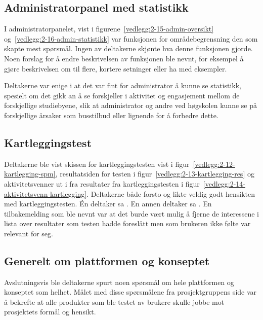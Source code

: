 \subsection{Administratorpanel med statistikk}

I administratorpanelet, vist i figurene~\ref{vedlegg:2-15-admin-oversikt} og~\ref{vedlegg:2-16-admin-statistikk} var funksjonen for områdebegrensning den som skapte mest spørsmål. Ingen av deltakerne skjønte hva denne funksjonen gjorde. Noen forslag for å endre beskrivelsen av funksjonen ble nevnt, for eksempel å gjøre beskrivelsen om til flere, kortere setninger eller ha med eksempler.

Deltakerne var enige i at det var fint for administrator å kunne se statistikk, spesielt om det gikk an å se forskjeller i aktivitet og engasjement mellom de forskjellige studiebyene, slik at administrator og andre ved høgskolen kunne se på forskjellige årsaker som busstilbud eller lignende for å forbedre dette.


\subsection{Kartleggingstest}

Deltakerne ble vist skissen for kartleggingstesten vist i figur~\ref{vedlegg:2-12-kartlegging-spm}, resultatsiden for testen i figur~\ref{vedlegg:2-13-kartlegging-res} og aktivitetsvenner ut i fra resultater fra kartleggingstesten i figur~\ref{vedlegg:2-14-aktivitetsvenn-kartlegging}. Deltakerne både forsto og likte veldig godt hensikten med kartleggingstesten. Én deltaker sa . En annen deltaker sa . En tilbakemelding som ble nevnt var at det burde vært mulig å fjerne de interessene i lista over resultater som testen hadde foreslått men som brukeren ikke følte var relevant for seg.


\subsection{Generelt om plattformen og konseptet}

Avslutningsvis ble deltakerne spurt noen spørsmål om hele plattformen og konseptet som helhet. Målet med disse spørsmålene fra prosjektgruppens side var å bekrefte at alle produkter som ble testet av brukere skulle jobbe mot prosjektets formål og hensikt.

